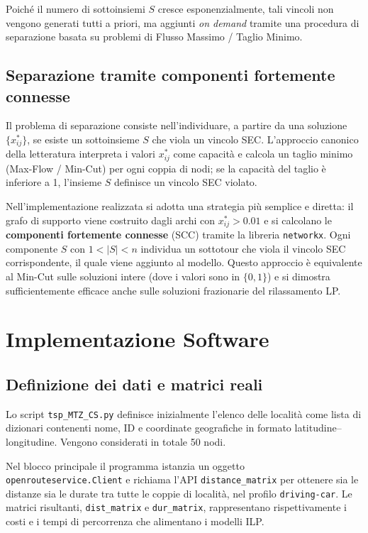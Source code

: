 \documentclass[a4paper,12pt]{article}
\begin{document}
Poiché il numero di sottoinsiemi \(S\) cresce esponenzialmente, tali vincoli non vengono generati tutti a priori, ma aggiunti \textit{on demand} tramite una procedura di separazione basata su problemi di Flusso Massimo / Taglio Minimo.

\subsection{Separazione tramite componenti fortemente connesse}

Il problema di separazione consiste nell’individuare, a partire da una soluzione \(\{x^*_{ij}\}\), se esiste un sottoinsieme \(S\) che viola un vincolo SEC.
L’approccio canonico della letteratura interpreta i valori \(x^*_{ij}\) come capacità e calcola un taglio minimo (Max-Flow / Min-Cut) per ogni coppia di nodi; se la capacità del taglio è inferiore a 1, l’insieme \(S\) definisce un vincolo SEC violato.

Nell’implementazione realizzata si adotta una strategia più semplice e diretta: il grafo di supporto viene costruito dagli archi con \(x^*_{ij}>0.01\) e si calcolano le \textbf{componenti fortemente connesse} (SCC) tramite la libreria \texttt{networkx}. Ogni componente \(S\) con \(1 < |S| < n\) individua un sottotour che viola il vincolo SEC corrispondente, il quale viene aggiunto al modello. Questo approccio è equivalente al Min-Cut sulle soluzioni intere (dove i valori sono in \(\{0,1\}\)) e si dimostra sufficientemente efficace anche sulle soluzioni frazionarie del rilassamento LP.

\newpage
\section{Implementazione Software}

\subsection{Definizione dei dati e matrici reali}

Lo script \texttt{tsp\_MTZ\_CS.py} definisce inizialmente l’elenco delle località come lista di dizionari contenenti nome, ID e coordinate geografiche in formato latitudine–longitudine.
Vengono considerati in totale 50 nodi.

Nel blocco principale il programma istanzia un oggetto \texttt{openrouteservice.Client} e richiama l’API \texttt{distance\_matrix} per ottenere sia le distanze sia le durate tra tutte le coppie di località, nel profilo \texttt{driving-car}. 
Le matrici risultanti, \texttt{dist\_matrix} e \texttt{dur\_matrix}, rappresentano rispettivamente i costi e i tempi di percorrenza che alimentano i modelli ILP.
\end{document}
